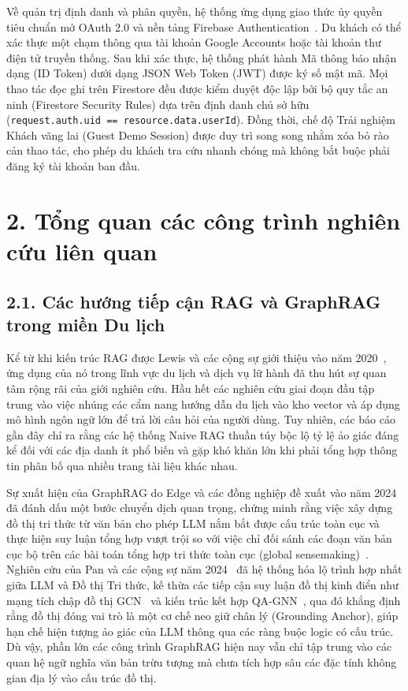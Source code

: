 Về quản trị định danh và phân quyền, hệ thống ứng dụng giao thức ủy quyền tiêu chuẩn mở OAuth 2.0 và nền tảng Firebase Authentication~\cite{hardt2012oauth}. Du khách có thể xác thực một chạm thông qua tài khoản Google Accounts hoặc tài khoản thư điện tử truyền thống. Sau khi xác thực, hệ thống phát hành Mã thông báo nhận dạng (ID Token) dưới dạng JSON Web Token (JWT) được ký số mật mã. Mọi thao tác đọc ghi trên Firestore đều được kiểm duyệt độc lập bởi bộ quy tắc an ninh (Firestore Security Rules) dựa trên định danh chủ sở hữu (\texttt{request.auth.uid == resource.data.userId}). Đồng thời, chế độ Trải nghiệm Khách vãng lai (Guest Demo Session) được duy trì song song nhằm xóa bỏ rào cản thao tác, cho phép du khách tra cứu nhanh chóng mà không bắt buộc phải đăng ký tài khoản ban đầu.

\section*{2. Tổng quan các công trình nghiên cứu liên quan}
{}

\subsection*{2.1. Các hướng tiếp cận RAG và GraphRAG trong miền Du lịch}
{}

Kể từ khi kiến trúc RAG được Lewis và các cộng sự giới thiệu vào năm 2020~\cite{lewis2020rag}, ứng dụng của nó trong lĩnh vực du lịch và dịch vụ lữ hành đã thu hút sự quan tâm rộng rãi của giới nghiên cứu. Hầu hết các nghiên cứu giai đoạn đầu tập trung vào việc nhúng các cẩm nang hướng dẫn du lịch vào kho vector và áp dụng mô hình ngôn ngữ lớn để trả lời câu hỏi của người dùng. Tuy nhiên, các báo cáo gần đây chỉ ra rằng các hệ thống Naive RAG thuần túy bộc lộ tỷ lệ ảo giác đáng kể đối với các địa danh ít phổ biến và gặp khó khăn lớn khi phải tổng hợp thông tin phân bố qua nhiều trang tài liệu khác nhau.

Sự xuất hiện của GraphRAG do Edge và các đồng nghiệp đề xuất vào năm 2024~\cite{edge2024graphrag} đã đánh dấu một bước chuyển dịch quan trọng, chứng minh rằng việc xây dựng đồ thị tri thức từ văn bản cho phép LLM nắm bắt được cấu trúc toàn cục và thực hiện suy luận tổng hợp vượt trội so với việc chỉ đối sánh các đoạn văn bản cục bộ trên các bài toán tổng hợp tri thức toàn cục (global sensemaking)~\cite{edge2024graphrag}. Nghiên cứu của Pan và các cộng sự năm 2024~\cite{pan2024unifying} đã hệ thống hóa lộ trình hợp nhất giữa LLM và Đồ thị Tri thức, kế thừa các tiếp cận suy luận đồ thị kinh điển như mạng tích chập đồ thị GCN~\cite{kipf2017gcn} và kiến trúc kết hợp QA-GNN~\cite{yasunaga2021qagnn}, qua đó khẳng định rằng đồ thị đóng vai trò là một cơ chế neo giữ chân lý (Grounding Anchor), giúp hạn chế hiện tượng ảo giác của LLM thông qua các ràng buộc logic có cấu trúc. Dù vậy, phần lớn các công trình GraphRAG hiện nay vẫn chỉ tập trung vào các quan hệ ngữ nghĩa văn bản trừu tượng mà chưa tích hợp sâu các đặc tính không gian địa lý vào cấu trúc đồ thị.

